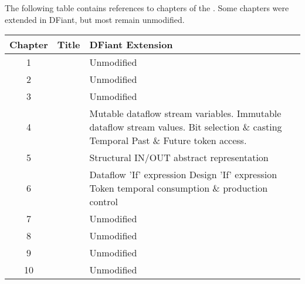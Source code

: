 The following table contains references to chapters of the . Some chapters were extended in DFiant, but most remain unmodified.\\
\begin{tabular}{||c|c|p{8cm}||}
	\hline 
	Chapter 		& Title 				& DFiant Extension \\ 
	\hline 
	1 & \chref{http://www.scala-lang.org/files/archive/spec/2.11/01-lexical-syntax.html}{Lexical Syntax}	& Unmodified \\ 
	\hline 
	2 & \chref{http://www.scala-lang.org/files/archive/spec/2.11/02-identifiers-names-and-scopes.html}{Identifiers, Names and Scopes} & Unmodified \\
	\hline 
	3 & \chref{http://www.scala-lang.org/files/archive/spec/2.11/03-types.html}{Types} & Unmodified \\
	\hline 
	4 & \chref{http://www.scala-lang.org/files/archive/spec/2.11/04-basic-declarations-and-definitions.html}{Basic Declarations and Definitions} & 
	Mutable dataflow stream variables. \newline 
	Immutable dataflow stream values. \newline 
	Bit selection \& casting \newline
	Temporal Past \& Future token access. \\
	\hline 
	5 & \chref{http://www.scala-lang.org/files/archive/spec/2.11/05-classes-and-objects.html}{Classes and Objects} & 
	Structural IN/OUT abstract representation \\
	\hline 
	6 & \chref{http://www.scala-lang.org/files/archive/spec/2.11/06-expressions.html}{Expressions} & 
	Dataflow 'If' expression \newline
	Design 'If' expression \newline
	Token temporal consumption \& production control \\
	\hline 
	7 & \chref{http://www.scala-lang.org/files/archive/spec/2.11/07-implicits.html}{Implicit} & Unmodified \\
	\hline 
	8 & \chref{http://www.scala-lang.org/files/archive/spec/2.11/08-pattern-matching.html}{Pattern Matching} & Unmodified \\
	\hline 
	9 & \chref{http://www.scala-lang.org/files/archive/spec/2.11/09-top-level-definitions.html}{Top-Level Definitions} & Unmodified \\
	\hline 
	10 & \chref{http://www.scala-lang.org/files/archive/spec/2.11/10-xml-expressions-and-patterns.html}{XML Expressions and Patterns} & Unmodified \\

\end{tabular}
